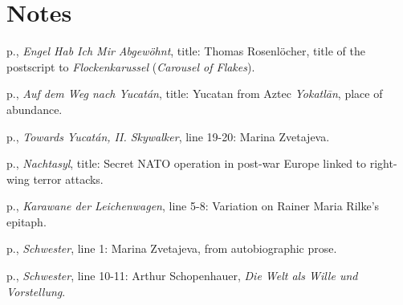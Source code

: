 \documentclass[11pt,twoside,final]{memoir}
\begin{document}

\mainmatter*

\book{\thetitle}

\setcounter{chapter}{0}





\backmatter



\chapter{Notes}

p\pageref{carousel}., \textit{Engel Hab Ich Mir Abgewöhnt}, title: Thomas Rosenlöcher, title of the postscript to \textit{Flockenkarussel} (\textit{Carousel of Flakes}).

p\pageref{yucatan}., \textit{Auf dem Weg nach Yucatán}, title: Yucatan from Aztec \textit{Yokatlān}, place of abundance.

p\pageref{summer-nights}., \textit{Towards Yucatán, II. Skywalker}, line 19-20: Marina Zvetajeva.

p\pageref{nachtasyl}., \textit{Nachtasyl}, title: Secret NATO operation in post-war Europe linked to right-wing terror attacks.

p\pageref{rilke}., \textit{Karawane der Leichenwagen}, line 5-8: Variation on Rainer Maria Rilke's epitaph.

p\pageref{marina-autobio}., \textit{Schwester}, line 1: Marina Zvetajeva, from autobiographic prose.

p\pageref{schop-die-welt}., \textit{Schwester}, line 10-11: Arthur Schopenhauer, \textit{Die Welt als Wille und Vorstellung}.


\cleartorecto
\thispagestyle{plain}


\emptysheet
\end{document}
